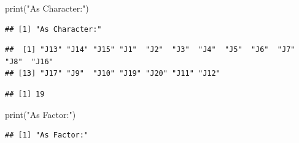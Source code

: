 \documentclass[
]{book}
\newenvironment{Shaded}{\begin{snugshade}}{\end{snugshade}}
\newcommand{\FunctionTok}[1]{\textcolor[rgb]{0.00,0.00,0.00}{#1}}
\newcommand{\NormalTok}[1]{#1}
\newcommand{\SpecialCharTok}[1]{\textcolor[rgb]{0.00,0.00,0.00}{#1}}
\newcommand{\StringTok}[1]{\textcolor[rgb]{0.31,0.60,0.02}{#1}}
\begin{document}
\begin{Shaded}
\begin{Highlighting}[]
\FunctionTok{print}\NormalTok{(}\StringTok{"As Character:"}\NormalTok{)}
\end{Highlighting}
\end{Shaded}

\begin{verbatim}
## [1] "As Character:"
\end{verbatim}

\begin{Shaded}
\end{Shaded}

\begin{verbatim}
##  [1] "J13" "J14" "J15" "J1"  "J2"  "J3"  "J4"  "J5"  "J6"  "J7"  "J8"  "J16"
## [13] "J17" "J9"  "J10" "J19" "J20" "J11" "J12"
\end{verbatim}

\begin{Shaded}
\end{Shaded}

\begin{verbatim}
## [1] 19
\end{verbatim}

\begin{Shaded}
\begin{Highlighting}[]
\FunctionTok{print}\NormalTok{(}\StringTok{"As Factor:"}\NormalTok{)}
\end{Highlighting}
\end{Shaded}

\begin{verbatim}
## [1] "As Factor:"
\end{verbatim}

\begin{Shaded}
\end{Shaded}
\end{document}
